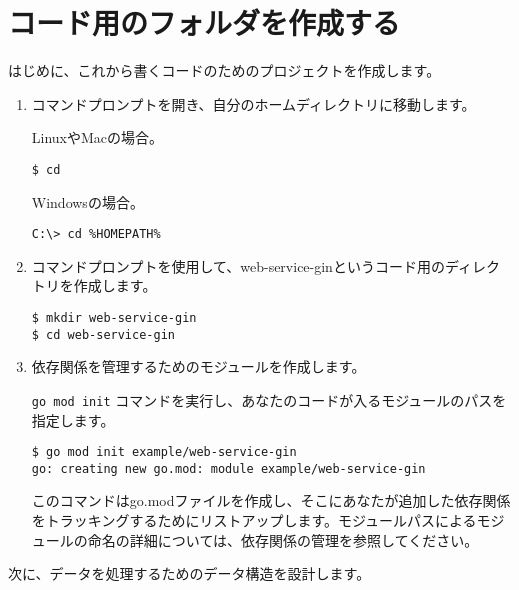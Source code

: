 \section{コード用のフォルダを作成する}

はじめに、これから書くコードのためのプロジェクトを作成します。

\begin{enumerate}
\item
  コマンドプロンプトを開き、自分のホームディレクトリに移動します。

  LinuxやMacの場合。



\begin{lstlisting}[numbers=none]
$ cd
\end{lstlisting}

  Windowsの場合。


\begin{lstlisting}[numbers=none]
C:\> cd %HOMEPATH%
\end{lstlisting}

\item
  コマンドプロンプトを使用して、web-service-ginというコード用のディレクトリを作成します。

\begin{lstlisting}[numbers=none]
$ mkdir web-service-gin
$ cd web-service-gin
\end{lstlisting}
\item
  依存関係を管理するためのモジュールを作成します。

  \texttt{go\ mod\ init}
  コマンドを実行し、あなたのコードが入るモジュールのパスを指定します。

\begin{lstlisting}[numbers=none]
$ go mod init example/web-service-gin
go: creating new go.mod: module example/web-service-gin
\end{lstlisting}

  このコマンドはgo.modファイルを作成し、そこにあなたが追加した依存関係をトラッキングするためにリストアップします。モジュールパスによるモジュールの命名の詳細については、依存関係の管理を参照してください。
\end{enumerate}

次に、データを処理するためのデータ構造を設計します。
